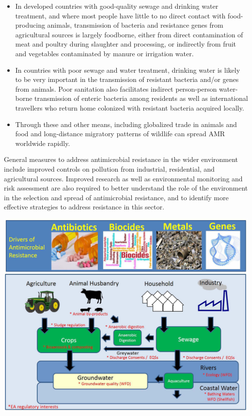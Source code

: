 \documentclass[
  11pt,
  paper=a4,
  ,captions=tableheading
]{scrartcl}
\providecommand{\tightlist}{%
  \setlength{\itemsep}{0pt}\setlength{\parskip}{0pt}}
\begin{document}
\begin{itemize}
\tightlist
\item
  In developed countries with good-quality sewage and drinking water
  treatment, and where most people have little to no direct contact with
  food-producing animals, transmission of bacteria and resistance genes
  from agricultural sources is largely foodborne, either from direct
  contamination of meat and poultry during slaughter and processing, or
  indirectly from fruit and vegetables contaminated by manure or
  irrigation water.
\item
  In countries with poor sewage and water treatment, drinking water is
  likely to be very important in the transmission of resistant bacteria
  and/or genes from animals. Poor sanitation also facilitates indirect
  person-person water-borne transmission of enteric bacteria among
  residents as well as international travellers who return home
  colonized with resistant bacteria acquired locally.
\item
  Through these and other means, including globalized trade in animals
  and food and long-distance migratory patterns of wildlife can spread
  AMR worldwide rapidly.
\end{itemize}

General measures to address antimicrobial resistance in the wider
environment include improved controls on pollution from industrial,
residential, and agricultural sources. Improved research as well as
environmental monitoring and risk assessment are also required to better
understand the role of the environment in the selection and spread of
antimicrobial resistance, and to identify more effective strategies to
address resistance in this sector.

\includegraphics[width=6.25in,height=\textheight]{images/hotspots.png}
\end{document}
